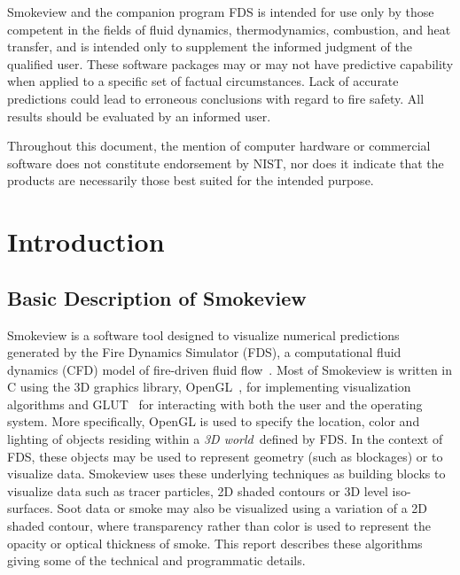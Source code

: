 \documentclass[11pt,twoside]{book}
\begin{document}
Smokeview and the companion program FDS is intended for use only
by those competent in the fields of fluid dynamics,
thermodynamics, combustion, and heat transfer, and is intended
only to supplement the informed judgment of the qualified user.
These software packages may or may not have predictive capability
when applied to a specific set of factual circumstances. Lack of
accurate predictions could lead to erroneous conclusions with
regard to fire safety. All results should be evaluated by an
informed user.

Throughout this document, the mention of computer hardware or
commercial software does not constitute endorsement by NIST,
nor does
it indicate that the products are necessarily those
best suited for the
intended purpose.

%
%



\tableofcontents
\listoffigures

\mainmatter


%
%

\chapter{Introduction}
\section{Basic Description of Smokeview}
Smokeview is a software tool designed to visualize numerical
predictions generated by the Fire Dynamics Simulator (FDS),
a computational fluid dynamics (CFD) model of fire-driven fluid
flow~\cite{FDS_Tech_Guide_5,FDS_Users_Guide_5}.
Most of Smokeview is written in C using the 3D graphics library, OpenGL~\cite{OpenGLRed}, for implementing visualization algorithms and GLUT~\cite{OpenGLGlut} for interacting with both the user and the operating system.
More specifically, OpenGL is used to
specify the location, color and
lighting of objects residing within a {\em 3D world}\ defined by FDS.
In the context of FDS, these objects
may be used to represent geometry (such as blockages) or to
visualize data.
Smokeview uses these underlying techniques as building blocks to visualize data such as tracer particles, 2D
shaded contours or 3D level iso-surfaces.  Soot data or
smoke may also be visualized using a variation of a 2D shaded
contour, where transparency rather than color is used to represent
the opacity or optical thickness of smoke.
This report describes these algorithms giving some of the technical and programmatic details.
\end{document}
